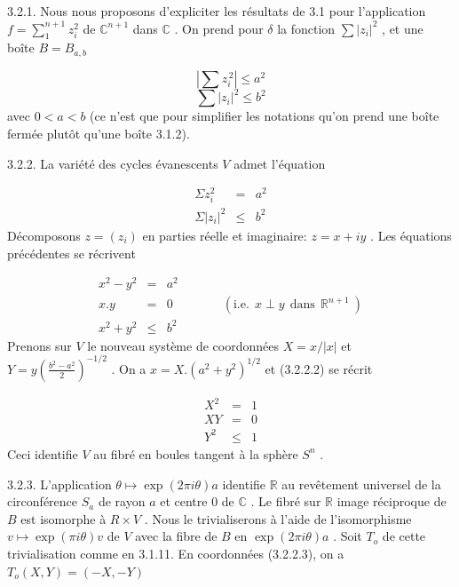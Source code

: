 3.2.1. Nous nous proposons d'expliciter les résultats de 3.1 pour l'application $f = \sum\limits_{1}^{n+1} z_i^2$ de $\mathbb{C}^{n+1}$ dans $\mathbb{C}$ . On prend pour $\delta$ la fonction $\sum |z_i|^2$ , et une boîte $B = B_{a,b}$

\begin{equation*}
| \sum z_i^{\,2} | \leq a^2
\end{equation*}
\begin{equation*}
\sum |z_i|^2 \leq b^2
\end{equation*}
avec $0 < a < b$ (ce n'est que pour simplifier les notations qu'on prend une boîte
fermée plutôt qu'une boîte 3.1.2).

3.2.2. La variété des cycles évanescents $V$ admet l'équation

\begin{equation}\tag{3.2.2.1}
\begin{array}{rcl}
\Sigma z_i^2 & = & a^2 \\
\Sigma |z_i|^2 & \leq & b^2
\end{array}
\end{equation}
Décomposons $z = (z_i)$ en parties réelle et imaginaire: $z = x + iy$ . Les équations précédentes se récrivent

\begin{equation}\tag{3.2.2.2}
\begin{array}{rcl}
x^2 - y^2 & = & a^2 \\
x.y & = & 0 \qquad\qquad (\mathrm{i.e.}\ \ x \perp y\ \ \mathrm{dans}\ \ \mathbb{R}^{n+1}\ ) \\
x^2 + y^2 & \leq & b^2
\end{array}
\end{equation}
Prenons sur $V$ le nouveau système de coordonnées $X = x/|x|$ et $Y = y(\frac{b^2-a^2}{2})^{-1/2}$ . On a $x = X. (a^2 + y^2)^{1/2}$ et (3.2.2.2) se récrit

\begin{equation}\tag{3.2.2.3}
\begin{array}{rcl}
X^2 & = & 1 \\
XY & = & 0 \\
Y^2 & \leq & 1
\end{array}
\end{equation}
Ceci identifie $V$ au fibré en boules tangent à la sphère $S^n$ .

3.2.3. L'application $\theta \longmapsto \exp(2\pi i\theta)a$ identifie $\mathbb{R}$ au revêtement universel de la circonférence $S_a$ de rayon $a$ et centre $0$ de $\mathbb{C}$ . Le fibré sur $\mathbb{R}$ image réciproque de $B$ est isomorphe à $R \times V$ . Nous le trivialiserons à l'aide de l'isomorphisme $v \longmapsto \exp (\pi i\theta)v$ de $V$ avec la fibre de $B$ en $\exp(2\pi i\theta)a$ . Soit $T_o$ de cette trivialisation comme en 3.1.11. En coordonnées (3.2.2.3), on a $T_o(X,Y) = (-X, -Y)$

